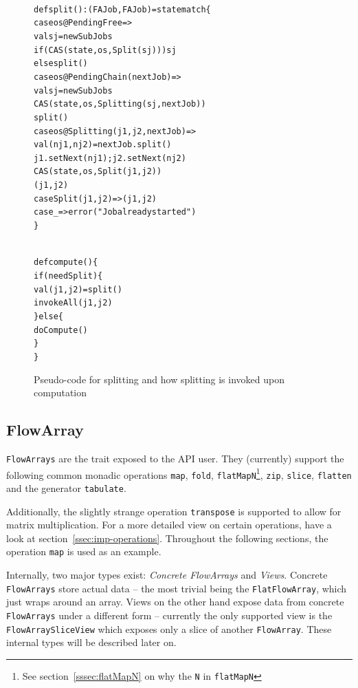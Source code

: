 \documentclass[runningheads,a4paper,fleqn]{llncs}
\begin{document}
\begin{figure}
\begin{minipage}[t]{7cm}
\begin{alltt}
{\scriptsize
def split(): (FAJob, FAJob) = state match \{
  case os@PendingFree =>
    val sj = newSubJobs
    if (CAS(state, os, Split(sj))) sj
    else split()
  case os@PendingChain(nextJob) =>
    val sj = newSubJobs
    CAS(state, os, Splitting(sj, nextJob))
    split()
  case os@Splitting(j1, j2, nextJob) =>
    val (nj1, nj2) = nextJob.split()
    j1.setNext(nj1); j2.setNext(nj2)
    CAS(state, os, Split(j1, j2))
    (j1, j2)
  case Split(j1, j2) => (j1, j2)
  case _ => error("Job already started")
\}
}
\end{alltt}
\end{minipage}
\begin{minipage}[t]{4cm}
\begin{alltt}
{\scriptsize
def compute() \{
  if (needSplit) \{
    val (j1, j2) = split()
    invokeAll(j1, j2)
  \} else \{
    doCompute()
  \}
\}
}
\end{alltt}
\end{minipage}
\caption{Pseudo-code for splitting and how splitting is invoked upon
  computation}
\label{fig:split-code}
\end{figure}

\subsection{FlowArray}
\label{ssec:flowarray}
\texttt{FlowArrays} are the trait exposed to the API user. They (currently)
support the following common monadic operations \texttt{map},
\texttt{fold}, \texttt{flatMapN}\footnote{See
  section~\ref{sssec:flatMapN} on why the \texttt{N} in
  \texttt{flatMapN}}, \texttt{zip}, \texttt{slice}, \texttt{flatten}
and the generator \texttt{tabulate}.

Additionally, the slightly strange operation \texttt{transpose} is
supported
to allow for matrix multiplication. For a more detailed view on 
certain operations, have a look at
section~\ref{ssec:imp-operations}. Throughout the following sections,
the operation \texttt{map} is used as an example.

Internally, two major types exist: \emph{Concrete FlowArrays} and
\emph{Views}. Concrete \texttt{FlowArrays} store actual data -- the most
trivial being the \texttt{FlatFlowArray}, which just wraps around an
array. Views on the other hand expose data from
concrete \texttt{FlowArrays} under a different form -- currently the
only supported view is the \texttt{FlowArraySliceView} which exposes
only a slice of another \texttt{FlowArray}. These internal types will be
described later on.
\end{document}
